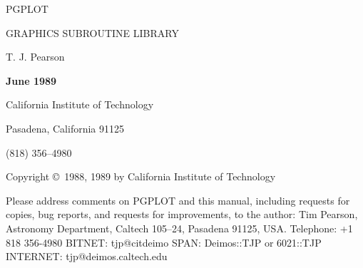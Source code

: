 
\phantom{PGPLOT}
\nopagenumbers
\vskip 0.5in
\centerline{\biggest PGPLOT}
\vskip 0.5in
\centerline{\big GRAPHICS SUBROUTINE LIBRARY}
\vskip 1.0in
\centerline{\big T. J. Pearson}
\vskip 0.5in
\centerline{\bf June 1989}

\vfill
\bf
\centerline{California Institute of Technology}
\centerline{Pasadena, California 91125}
\centerline{(818) 356--4980}
\bigskip
\centerline{Copyright \copyright\ 1988, 1989 by California Institute of 
Technology}
\vskip 0.5in
\eject

\phantom{PGPLOT}
\rm
\vfill
{}
\bigskip\noindent
Please address comments on PGPLOT and this manual, including requests 
for copies, bug reports, and requests for improvements, to the author:
{\obeylines\smallskip
Tim Pearson, 
Astronomy Department, 
Caltech 105--24, 
Pasadena 91125, 
USA.
\medskip
Telephone:   +1 818 356-4980
BITNET:   tjp@citdeimo
SPAN: Deimos::TJP or 6021::TJP
INTERNET: tjp@deimos.caltech.edu
}
\vfill
\eject

